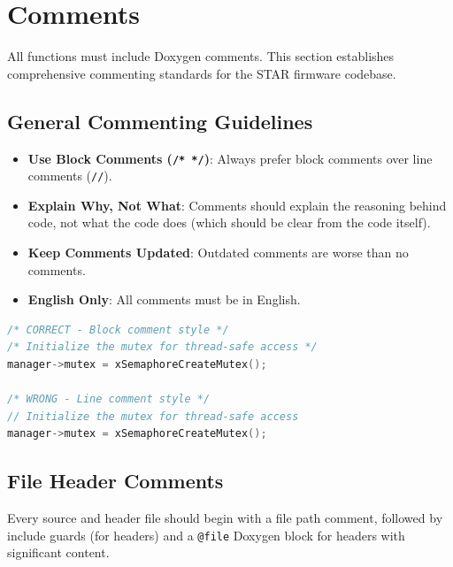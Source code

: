 \section{Comments}

All functions must include Doxygen comments. This section establishes comprehensive commenting standards for the STAR firmware codebase.

\subsection{General Commenting Guidelines}

\begin{itemize}
    \item \textbf{Use Block Comments (\texttt{/* */})}: Always prefer block comments over line comments (\texttt{//}).
    \item \textbf{Explain Why, Not What}: Comments should explain the reasoning behind code, not what the code does (which should be clear from the code itself).
    \item \textbf{Keep Comments Updated}: Outdated comments are worse than no comments.
    \item \textbf{English Only}: All comments must be in English.
\end{itemize}

\begin{lstlisting}[language=C]
/* CORRECT - Block comment style */
/* Initialize the mutex for thread-safe access */
manager->mutex = xSemaphoreCreateMutex();

/* WRONG - Line comment style */
// Initialize the mutex for thread-safe access
manager->mutex = xSemaphoreCreateMutex();
\end{lstlisting}

\subsection{File Header Comments}

Every source and header file should begin with a file path comment, followed by include guards (for headers) and a \texttt{@file} Doxygen block for headers with significant content.

